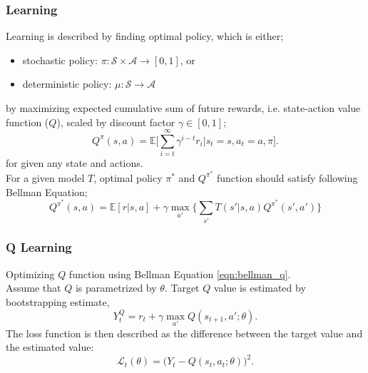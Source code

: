 \documentclass{beamer}
\begin{document}
\begin{frame}
\frametitle{Learning}
Learning is described by finding optimal policy, which is either;
\begin{itemize}
	\item stochastic policy: $\pi: \mathcal{S}\times\mathcal{A} \rightarrow [0,1]$, or
	\item deterministic policy: $\mu: \mathcal{S}\rightarrow\mathcal{A}$
\end{itemize}
by maximizing expected cumulative sum of future rewards, i.e. state-action value function ($Q$), scaled by discount factor $\gamma \in [0,1]$;
\begin{equation}
Q^{\pi}(s,a) = \mathbb{E}\bigg[\sum_{i=t}^{\infty} \gamma^{i-t} r_i|s_t=s, a_t=a, \pi\bigg]. %
\end{equation}
for given any state and actions. \\
For a given model $T$, optimal policy $\pi^*$ and $Q^{\pi^*}$ function should satisfy following Bellman Equation;
\begin{equation}
\label{eqn:bellman_q}
Q^{\pi^*}(s,a) = \mathbb{E}[r|s,a] + \gamma \max_{a'} \Big\{ \sum_{s'} T(s'|s,a) Q^{\pi^*}(s',a') \Big\}
\end{equation}
\end{frame}

\begin{frame}
\frametitle{Q Learning}
Optimizing $Q$ function using Bellman Equation \ref{eqn:bellman_q}.\\
Assume that $Q$ is parametrized by $\theta$.
Target $Q$ value is estimated by bootstrapping estimate, 
\begin{equation}
\label{eqn:q_target}
Y_t^Q = r_t + \gamma \max_{a'} Q(s_{t+1},a';\theta).
\end{equation}
The loss function is then described as the difference between the target value and the estimated value:
\begin{equation}
\label{eqn:q_loss}
\mathcal{L}_t(\theta) = \big( Y_t - Q(s_t,a_t;\theta) \big) ^ 2.
\end{equation}
\end{frame}

\end{document}
